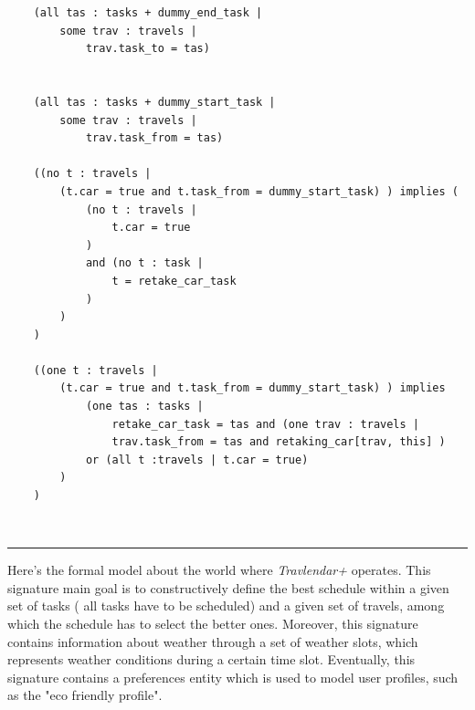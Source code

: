 \begin{verbatim}
    (all tas : tasks + dummy_end_task |
        some trav : travels |
            trav.task_to = tas)
            
            
    (all tas : tasks + dummy_start_task |
        some trav : travels | 
            trav.task_from = tas)
            
    ((no t : travels |
        (t.car = true and t.task_from = dummy_start_task) ) implies ( 
            (no t : travels |
                t.car = true 
            ) 
            and (no t : task |
                t = retake_car_task
            )
        )
    )
    
    ((one t : travels | 
        (t.car = true and t.task_from = dummy_start_task) ) implies
            (one tas : tasks | 
                retake_car_task = tas and (one trav : travels | 
                trav.task_from = tas and retaking_car[trav, this] ) 
            or (all t :travels | t.car = true)
        )
    )
\end{verbatim}
\\
\rule{\textwidth}{0.4pt}
Here's the formal model about the world where \emph{Travlendar+} operates. This signature main goal is to constructively define the best schedule within a given set of tasks ( all tasks have to be scheduled) and a given set of travels, among which the schedule has to select the better ones. Moreover, this signature contains information about weather through a set of weather slots, which represents weather conditions during a certain time slot. Eventually, this signature contains a preferences entity which is used to model user profiles, such as the "eco friendly profile". 
